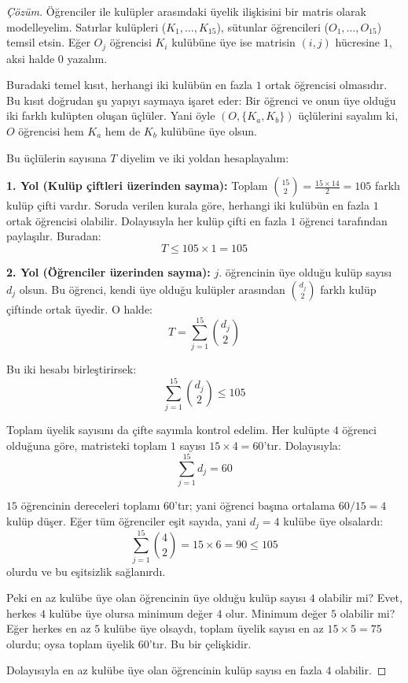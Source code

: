 \begin{proof}[Çözüm]
Öğrenciler ile kulüpler arasındaki üyelik ilişkisini bir matris olarak modelleyelim. Satırlar kulüpleri ($K_1, \dots, K_{15}$), sütunlar öğrencileri ($O_1, \dots, O_{15}$) temsil etsin. Eğer $O_j$ öğrencisi $K_i$ kulübüne üye ise matrisin $(i, j)$ hücresine $1$, aksi halde $0$ yazalım.

Buradaki temel kısıt, herhangi iki kulübün en fazla $1$ ortak öğrencisi olmasıdır. Bu kısıt doğrudan şu yapıyı saymaya işaret eder: Bir öğrenci ve onun üye olduğu iki farklı kulüpten oluşan üçlüler. Yani öyle $(O, \{K_a, K_b\})$ üçlülerini sayalım ki, $O$ öğrencisi hem $K_a$ hem de $K_b$ kulübüne üye olsun.

Bu üçlülerin sayısına $T$ diyelim ve iki yoldan hesaplayalım:

\textbf{1. Yol (Kulüp çiftleri üzerinden sayma):}
Toplam $\binom{15}{2} = \frac{15 \times 14}{2} = 105$ farklı kulüp çifti vardır.
Soruda verilen kurala göre, herhangi iki kulübün en fazla $1$ ortak öğrencisi olabilir. Dolayısıyla her kulüp çifti en fazla $1$ öğrenci tarafından paylaşılır. Buradan:
\[ T \le 105 \times 1 = 105 \]

\textbf{2. Yol (Öğrenciler üzerinden sayma):}
$j$. öğrencinin üye olduğu kulüp sayısı $d_j$ olsun. Bu öğrenci, kendi üye olduğu kulüpler arasından $\binom{d_j}{2}$ farklı kulüp çiftinde ortak üyedir. O halde:
\[ T = \sum_{j=1}^{15} \binom{d_j}{2} \]

Bu iki hesabı birleştirirsek:
\[ \sum_{j=1}^{15} \binom{d_j}{2} \le 105 \]

Toplam üyelik sayısını da çifte sayımla kontrol edelim. Her kulüpte $4$ öğrenci olduğuna göre, matristeki toplam $1$ sayısı $15 \times 4 = 60$'tır. Dolayısıyla:
\[ \sum_{j=1}^{15} d_j = 60 \]

$15$ öğrencinin dereceleri toplamı $60$'tır; yani öğrenci başına ortalama $60 / 15 = 4$ kulüp düşer.
Eğer tüm öğrenciler eşit sayıda, yani $d_j = 4$ kulübe üye olsalardı:
\[ \sum_{j=1}^{15} \binom{4}{2} = 15 \times 6 = 90 \le 105 \]
olurdu ve bu eşitsizlik sağlanırdı.

Peki en az kulübe üye olan öğrencinin üye olduğu kulüp sayısı $4$ olabilir mi? Evet, herkes $4$ kulübe üye olursa minimum değer $4$ olur.
Minimum değer $5$ olabilir mi? Eğer herkes en az $5$ kulübe üye olsaydı, toplam üyelik sayısı en az $15 \times 5 = 75$ olurdu; oysa toplam üyelik $60$'tır. Bu bir çelişkidir.

Dolayısıyla en az kulübe üye olan öğrencinin kulüp sayısı en fazla $4$ olabilir.
\end{proof}

